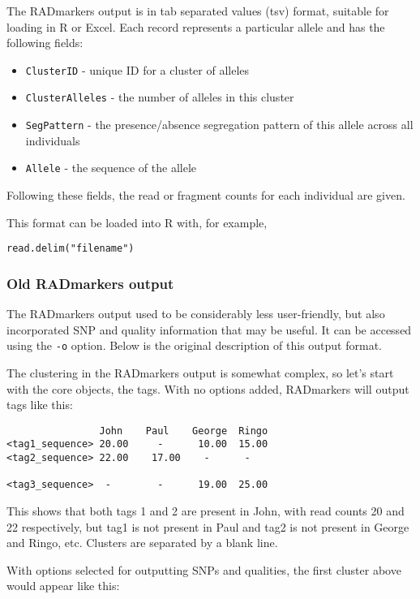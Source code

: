\documentclass[a4paper]{article}
\begin{document}
The RADmarkers output is in tab separated values (tsv) format, suitable for loading in R or Excel. Each record represents a particular allele and has the following fields:

\begin{itemize}
    \item \verb|ClusterID| - unique ID for a cluster of alleles
    \item \verb|ClusterAlleles| - the number of alleles in this cluster
    \item \verb|SegPattern| - the presence/absence segregation pattern of this allele across all individuals
    \item \verb|Allele| - the sequence of the allele
\end{itemize}

Following these fields, the read or fragment counts for each individual are given.

This format can be loaded into R with, for example,

\begin{verbatim}
read.delim("filename")
\end{verbatim}

\subsubsection{Old RADmarkers output}

The RADmarkers output used to be considerably less user-friendly, but also incorporated SNP and quality information that may be useful. It can be accessed using the \verb|-o| option. Below is the original description of this output format.

The clustering in the RADmarkers output is somewhat complex, so let's start with the core objects, the tags. With no options added, RADmarkers will output tags like this:

\begin{verbatim}
                John    Paul    George  Ringo
<tag1_sequence> 20.00     -      10.00  15.00
<tag2_sequence> 22.00    17.00    -      -

<tag3_sequence>  -        -      19.00  25.00
\end{verbatim}

This shows that both tags 1 and 2 are present in John, with read counts 20 and 22 respectively, but tag1 is not present in Paul and tag2 is not present in George and Ringo, etc. Clusters are separated by a blank line.

With options selected for outputting SNPs and qualities, the first cluster above would appear like this:
\end{document}
